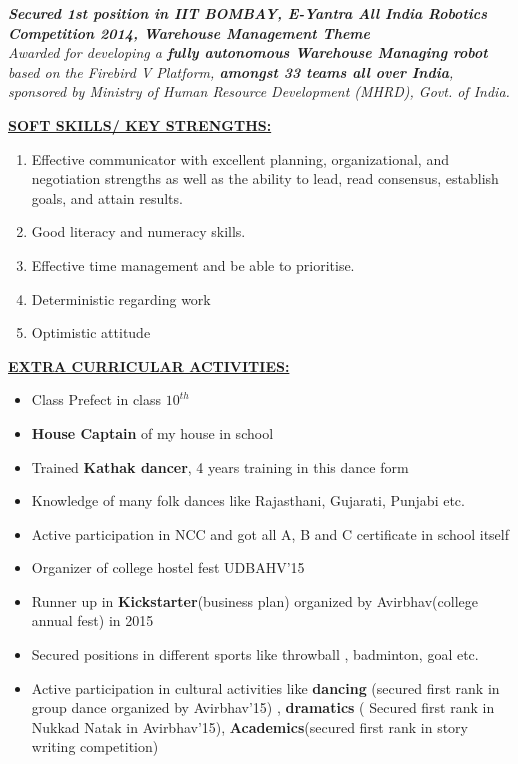 \documentclass{article}
\begin{document}
				\begin{center}
					\emph{\textbf{Secured 1st position in IIT BOMBAY, E-Yantra All India Robotics Competition 2014, Warehouse Management Theme}\\
						Awarded for developing a \textbf{fully autonomous Warehouse Managing robot} based on the Firebird V Platform, \textbf{amongst 33 teams all over India}, sponsored by Ministry of Human Resource Development (MHRD), Govt. of India.}
					\\[\baselineskip]
				\end{center}
				\underline{\textbf{SOFT SKILLS/ KEY STRENGTHS:}}\\
				\begin{enumerate}
					\item Effective communicator with excellent planning, organizational, and negotiation strengths as well as the ability to lead, read consensus, establish goals, and attain results.
					\item Good literacy and numeracy skills.
					\item Effective time management and be able to prioritise.
					\item Deterministic regarding work
					\item Optimistic attitude
					\\[\baselineskip]
				\end{enumerate}
				\underline{\textbf{EXTRA CURRICULAR ACTIVITIES:}}\\
				\begin{itemize}
					\item Class Prefect in class $10^{th}$
					\item \textbf{House Captain} of my house in school
					\item Trained \textbf{Kathak dancer}, 4 years training in this dance form
					\item Knowledge of many folk dances like Rajasthani, Gujarati, Punjabi etc.
					\item Active participation in NCC and got all A, B and C certificate in school itself
					\item Organizer of college hostel fest UDBAHV'15
					\item Runner up in \textbf{Kickstarter}(business plan) organized by Avirbhav(college annual fest) in 2015 
					\item Secured positions in different sports like throwball , badminton, goal etc.
					\item Active participation in cultural activities like \textbf{dancing} (secured first rank in group dance organized by Avirbhav'15) , \textbf{dramatics} ( Secured first rank in Nukkad Natak in Avirbhav'15), \textbf{Academics}(secured first rank in story writing competition)
					\\[\baselineskip]
				\end{itemize}
\end{document}

